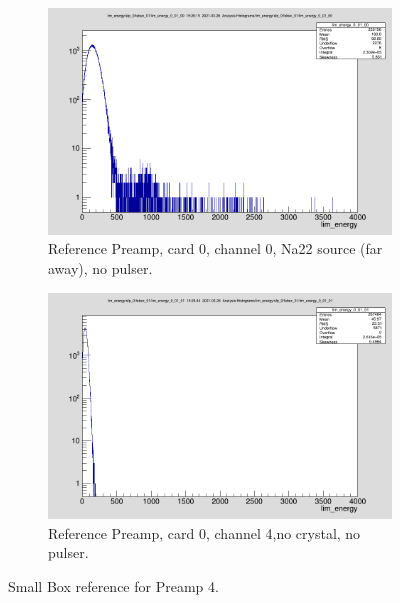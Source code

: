 \documentclass{report}
\begin{document}
\begin{figure}[!htb]
  \centering
  \begin{subfigure}[b]{0.45\textwidth}
    \includegraphics[width=\linewidth]{preamp4_ref_ch0.png}
          \caption{Reference Preamp, card 0, channel 0, Na22 source (far away), no pulser.}
  \end{subfigure}
  \begin{subfigure}[b]{0.4\textwidth}
    \includegraphics[width=\linewidth]{preamp4_ref_ch1_no_crystal.png}
    \caption{Reference Preamp, card 0, channel 4,no crystal, no pulser.}
  \end{subfigure}
  \caption{Small Box reference for Preamp 4.}
\end{figure}
\newpage
\clearpage
\end{document}
